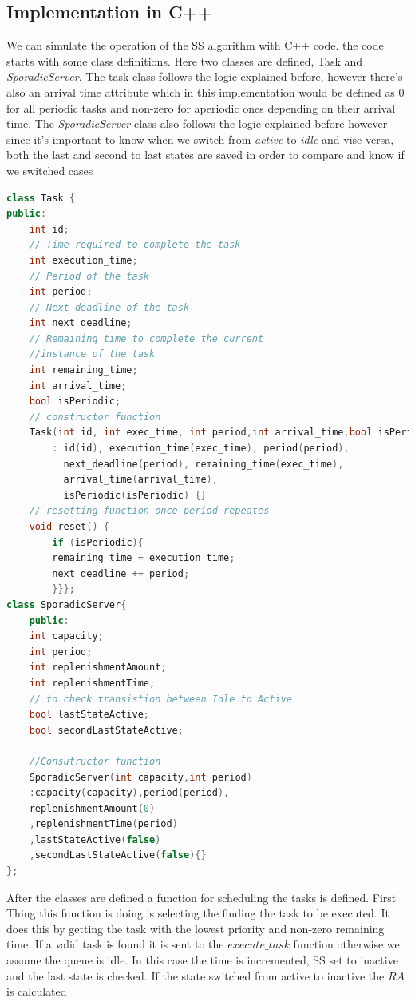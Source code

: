 \documentclass[conference]{IEEEtran}
\begin{document}
\subsection{Implementation in C++}
We can simulate the operation of the SS algorithm with C++ code. the code starts with some class definitions. Here two classes are defined, Task and \textit{SporadicServer}. The task class follows the logic explained before, however there's also an arrival time attribute which in this implementation would be defined as 0 for all periodic tasks and non-zero for aperiodic ones depending on their arrival time.
The \textit{SporadicServer} class also follows the logic explained before however since it's important to know when we switch from \textit{active} to \textit{idle} and vise versa, both the last and second to last states are saved in order to compare and know if we switched cases
\begin{lstlisting}[language=C++]
class Task {
public:
    int id;
    // Time required to complete the task
    int execution_time; 
    // Period of the task
    int period;    
    // Next deadline of the task
    int next_deadline; 
    // Remaining time to complete the current 
    //instance of the task
    int remaining_time; 
    int arrival_time;
    bool isPeriodic;
    // constructor function
    Task(int id, int exec_time, int period,int arrival_time,bool isPeriodic)
        : id(id), execution_time(exec_time), period(period),
          next_deadline(period), remaining_time(exec_time),
          arrival_time(arrival_time),
          isPeriodic(isPeriodic) {}
    // resetting function once period repeates 
    void reset() {
        if (isPeriodic){
        remaining_time = execution_time;
        next_deadline += period;
        }}};
class SporadicServer{
    public:
    int capacity;
    int period;
    int replenishmentAmount;
    int replenishmentTime;
    // to check transistion between Idle to Active
    bool lastStateActive; 
    bool secondLastStateActive;

    //Consutructor function
    SporadicServer(int capacity,int period)
    :capacity(capacity),period(period),
    replenishmentAmount(0)
    ,replenishmentTime(period)
    ,lastStateActive(false)
    ,secondLastStateActive(false){}
};
\end{lstlisting}
After the classes are defined a function for scheduling the tasks is defined. First Thing this function is doing is selecting the finding the task to be executed. It does this by getting the task with the lowest priority and non-zero remaining time. If a valid task is found it is sent to the \textit{$execute\_task$} function otherwise we assume the queue is idle. In this case the time is incremented, SS set to inactive and the last state is checked. If the state switched from active to inactive the $RA$ is calculated
\end{document}
